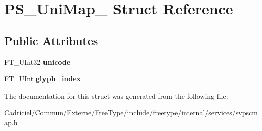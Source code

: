 \hypertarget{struct_p_s___uni_map__}{\section{P\-S\-\_\-\-Uni\-Map\-\_\- Struct Reference}
\label{struct_p_s___uni_map__}
}
\subsection*{Public Attributes}
\begin{DoxyCompactItemize}
\item 
\hypertarget{struct_p_s___uni_map___a87c1f471eb4033fc5ed9d0f1ecaf35a1}{F\-T\-\_\-\-U\-Int32 {\bfseries unicode}}\label{struct_p_s___uni_map___a87c1f471eb4033fc5ed9d0f1ecaf35a1}

\item 
\hypertarget{struct_p_s___uni_map___a0d5b2e3c405aeab1f1059a3587125cfd}{F\-T\-\_\-\-U\-Int {\bfseries glyph\-\_\-index}}\label{struct_p_s___uni_map___a0d5b2e3c405aeab1f1059a3587125cfd}

\end{DoxyCompactItemize}


The documentation for this struct was generated from the following file\-:\begin{DoxyCompactItemize}
\item 
Cadriciel/\-Commun/\-Externe/\-Free\-Type/include/freetype/internal/services/svpscmap.\-h\end{DoxyCompactItemize}
